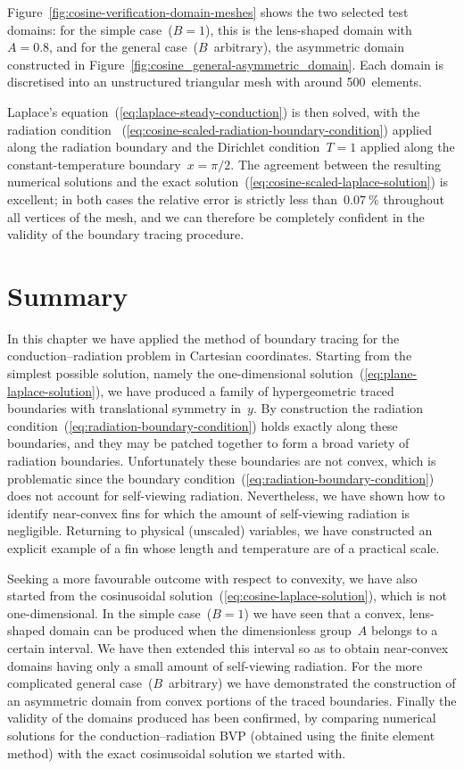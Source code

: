 Figure~\ref{fig:cosine-verification-domain-meshes}
shows the two selected test domains:
for the simple case~($B = 1$),
this is the lens-shaped domain with~$A = 0.8$,
and for the general case~($B$~arbitrary),
the asymmetric domain constructed
in Figure~\ref{fig:cosine_general-asymmetric_domain}.
Each domain is discretised into an unstructured triangular mesh
with around 500~elements.

Laplace's equation~(\ref{eq:laplace-steady-conduction}) is then solved,
with the radiation condition~%
  (\ref{eq:cosine-scaled-radiation-boundary-condition})
applied along the radiation boundary
and the Dirichlet condition~$T = 1$ applied
along the constant-temperature boundary~$x = \pi/2$.
The agreement between the resulting numerical solutions
and the exact solution~(\ref{eq:cosine-scaled-laplace-solution})
is excellent;
in both cases the relative error is strictly less than~$\SI{0.07}{\percent}$
throughout all vertices of the mesh,
and we can therefore be completely confident
in the validity of the boundary tracing procedure.

\section{Summary}
\label{sec:cartesian.summary}

In this chapter we have applied the method of boundary tracing
for the conduction--radiation problem in Cartesian coordinates.
Starting from the simplest possible solution,
namely the one-dimensional solution~(\ref{eq:plane-laplace-solution}),
we have produced
a family of hypergeometric traced boundaries
with translational symmetry in~$y$.
By construction
the radiation condition~(\ref{eq:radiation-boundary-condition})
holds exactly along these boundaries,
and they may be patched together
to form a broad variety of radiation boundaries.
Unfortunately these boundaries are not convex,
which is problematic
since the boundary condition~(\ref{eq:radiation-boundary-condition})
does not account for self-viewing radiation.
Nevertheless, we have shown how to identify near-convex fins
for which the amount of self-viewing radiation is negligible.
Returning to physical (unscaled) variables,
we have constructed an explicit example of a fin
whose length and temperature are of a practical scale.

Seeking a more favourable outcome with respect to convexity,
we have also started from
the cosinusoidal solution~(\ref{eq:cosine-laplace-solution}),
which is not one-dimensional.
In the simple case~($B = 1$)
we have seen that a convex, lens-shaped domain can be produced
when the dimensionless group~$A$ belongs to a certain interval.
We have then extended this interval
so as to obtain near-convex domains
having only a small amount of self-viewing radiation.
For the more complicated general case~($B$~arbitrary)
we have demonstrated the construction of an asymmetric domain
from convex portions of the traced boundaries.
Finally the validity of the domains produced has been confirmed,
by comparing numerical solutions for the conduction--radiation BVP
(obtained using the finite element method)
with the exact cosinusoidal solution
we started with.
